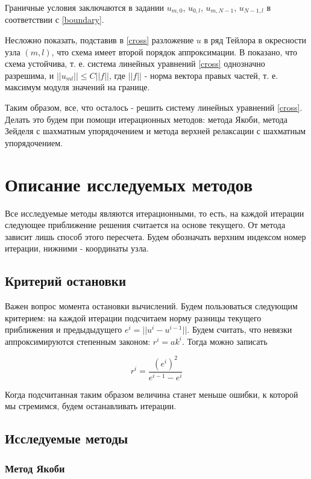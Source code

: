 \documentclass[report , a4paper, onecolumn, 12pt]{article}
\begin{document}
Граничные условия заключаются в задании $u_{m,0}$, $u_{0,l}$, $u_{m, N - 1}$, $u_{N - 1,l}$ в соответствии с \ref{boundary}.

Несложно показать, подставив в \ref{cross} разложение $u$ в ряд Тейлора в окресности узла $(m, l)$, что схема имеет второй порядок аппроксимации. В \cite{aristova} показано, что схема устойчива, т. е. система линейных уравнений \ref{cross} однозначно разрешима, и $||u_{ml}|| \le C ||f||$, где $||f||$ - норма вектора правых частей, т. е. максимум модуля значений на границе. 

Таким образом, все, что осталось - решить систему линейных уравнений \ref{cross}. Делать это будем при помощи итерационных методов: метода Якоби, метода Зейделя с шахматным упорядочением и метода верхней релаксации с шахматным упорядочением.

\section{Описание исследуемых методов}

Все исследуемые методы являются итерационными, то есть, на каждой итерации следующее приближение решения считается на основе текущего. От метода зависит лишь способ этого пересчета. Будем обозначать верхним индексом номер итерации, нижними - координаты узла.

\subsection{Критерий остановки}

Важен вопрос момента остановки вычислений. Будем пользоваться следующим критерием: на каждой итерации подсчитаем норму разницы текущего приближения и предыдыдущего $e^i = ||u^i - u^{i - 1}||$. Будем считать, что невязки аппроксимируются степенным законом: $r^i = a k^i$. Тогда можно записать

\begin{equation}
 r^i = \frac{(e^i)^2}{e^{i - 1} - e^i }
\end{equation}

Когда подсчитанная таким образом величина станет меньше ошибки, к которой мы стремимся, будем останавливать итерации.


\subsection{Исследуемые методы}

\subsubsection{Метод Якоби}
\end{document}

